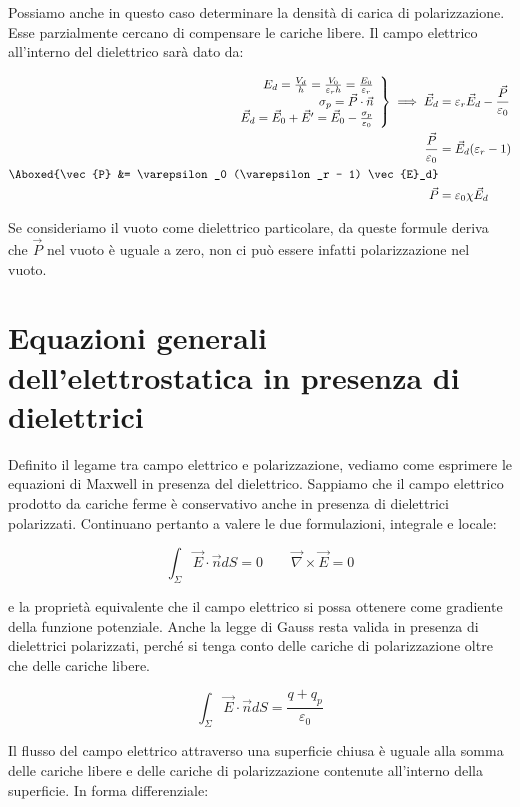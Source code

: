 Possiamo anche in questo caso determinare la densità di carica di polarizzazione. Esse parzialmente cercano di compensare le cariche libere. Il campo elettrico all'interno del dielettrico sarà dato da:

\begin{align*}
		\left. \begin{array}{r}
	 	E_d = \frac{V_d}{h} = \frac{V_0}{\varepsilon_r h} = \frac{E_0}{\varepsilon_r} \\
	 	\sigma_p = \vec{P} \cdot \vec{n} \\
	 	\vec{E}_d = \vec{E}_0 + \vec{E}'= \vec{E}_0 - \frac{\sigma_p}{\varepsilon_0}
	\end{array} \right\} \implies \vec{E}_d &= \varepsilon_r \vec{E}_d - \frac{\vec{P}}{\varepsilon_0} \\
	\frac{\vec{P}}{\varepsilon_0} &= \vec{E}_d(\varepsilon_r -1) \\
	\Aboxed{\vec{P} &= \varepsilon_0 (\varepsilon_r - 1) \vec{E}_d} \\
	\vec{P} &= \varepsilon_0 \chi \vec{E}_d
\end{align*}

Se consideriamo il vuoto come dielettrico particolare, da queste formule deriva che $\vec{P}$ nel vuoto è uguale a zero, non ci può essere infatti polarizzazione nel vuoto.

\section{Equazioni generali dell'elettrostatica in presenza di dielettrici}

Definito il legame tra campo elettrico e polarizzazione, vediamo come esprimere le equazioni di Maxwell in presenza del dielettrico. Sappiamo che il campo elettrico prodotto da cariche ferme è conservativo anche in presenza di dielettrici polarizzati. Continuano pertanto a valere le due formulazioni, integrale e locale:

\[
	\int_{\Sigma} \vec{E} \cdot \vec{n} dS = 0 \qquad \vec{\nabla} \times \vec{E} =0
\]

e la proprietà equivalente che il campo elettrico si possa ottenere come gradiente della funzione potenziale. Anche la legge di Gauss resta valida in presenza di dielettrici polarizzati, perché si tenga conto delle cariche di polarizzazione oltre che delle cariche libere.

\[
	\int_{\Sigma} \vec{E} \cdot \vec{n} dS = \frac{q+q_p}{\varepsilon_0}
\]

Il flusso del campo elettrico attraverso una superficie chiusa è uguale alla somma delle cariche libere e delle cariche di polarizzazione contenute all'interno della superficie. In forma differenziale:


